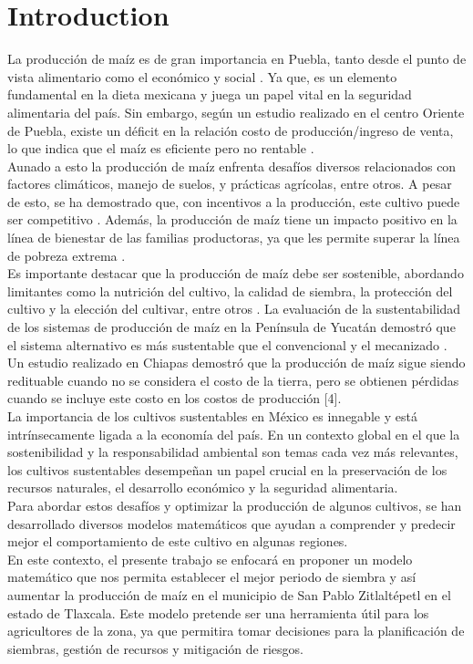 \documentclass[utf8]{FrontiersinHarvard} %
\begin{document}
\section{Introduction}

La producción de maíz es de gran importancia en Puebla, tanto desde el punto de vista alimentario como el económico y social \cite{Zepeda2020LaPE}. 
Ya que, es un elemento fundamental en la dieta mexicana y juega un papel vital en la seguridad alimentaria del país. 
Sin embargo, según un estudio realizado en el centro Oriente de Puebla, existe un déficit en la relación costo de producción/ingreso de venta, 
lo que indica que el maíz es eficiente pero no rentable \cite{Cita1}.\\
Aunado a esto la producción de maíz enfrenta desafíos diversos relacionados con factores climáticos, manejo de suelos, y prácticas agrícolas, entre otros.  A pesar de esto, se ha demostrado que, con incentivos a la producción, este cultivo puede ser competitivo \cite{Cita1}. 
Además, la producción de maíz tiene un impacto positivo en la línea de bienestar de las familias productoras, ya que les permite superar la línea de pobreza extrema \citep{Zepeda2020LaPE}.\\
Es importante destacar que la producción de maíz debe ser sostenible, abordando limitantes como la nutrición del cultivo, la calidad de siembra, la protección del cultivo y la elección del cultivar, entre otros\citep{Cita3} . 
La evaluación de la sustentabilidad de los sistemas de producción de maíz en la Península de Yucatán demostró que el sistema alternativo es más sustentable que el convencional y el mecanizado \citep{Cita5}.\\

Un estudio realizado en Chiapas demostró que la producción de maíz sigue siendo redituable cuando no se considera el costo de la tierra, pero se obtienen pérdidas cuando se incluye este costo en los costos de producción \cite{Cita4} [4].
\\
La importancia de los cultivos sustentables en México es innegable y está intrínsecamente ligada a la economía del país. En un contexto global en el que la sostenibilidad y la responsabilidad ambiental son temas cada vez más relevantes, los cultivos sustentables desempeñan un papel crucial en la preservación de los recursos naturales, el desarrollo económico y la seguridad alimentaria.
\\
Para abordar estos desafíos y optimizar la producción de algunos cultivos, se han desarrollado diversos modelos matemáticos que ayudan a comprender y predecir mejor el comportamiento de este cultivo en algunas regiones.
\\
En este contexto, el presente trabajo se enfocará en proponer un modelo matemático que nos permita establecer el mejor periodo de siembra y así aumentar la producción de maíz en el municipio de San Pablo Zitlaltépetl en el estado de Tlaxcala. Este modelo pretende ser una herramienta útil para los agricultores de la zona, ya que permitira tomar decisiones para la planificación de siembras, gestión de recursos y mitigación de riesgos.
\end{document}

